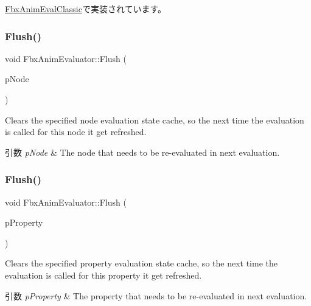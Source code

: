 \hyperlink{class_fbx_anim_eval_classic_a3618b50c5fd35f18f5e6f873ca07cf2e}{Fbx\+Anim\+Eval\+Classic}で実装されています。

\mbox{\label{class_fbx_anim_evaluator_a17b08c51a766be597aac881807913ea8}} 
\subsubsection{\texorpdfstring{Flush()}{Flush()}\hspace{0.1cm}{\footnotesize\ttfamily [1/2]}}
{\footnotesize\ttfamily void Fbx\+Anim\+Evaluator\+::\+Flush (\begin{DoxyParamCaption}\item[{\hyperlink{class_fbx_node}{Fbx\+Node} $\ast$}]{p\+Node }\end{DoxyParamCaption})}

Clears the specified node evaluation state cache, so the next time the evaluation is called for this node it get refreshed. 
\begin{DoxyParams}{引数}
{\em p\+Node} & The node that needs to be re-\/evaluated in next evaluation. \\
\hline
\end{DoxyParams}
\mbox{\label{class_fbx_anim_evaluator_a2f738a737153248cc988aca609c4bf84}} 
\subsubsection{\texorpdfstring{Flush()}{Flush()}\hspace{0.1cm}{\footnotesize\ttfamily [2/2]}}
{\footnotesize\ttfamily void Fbx\+Anim\+Evaluator\+::\+Flush (\begin{DoxyParamCaption}\item[{\hyperlink{class_fbx_property}{Fbx\+Property} \&}]{p\+Property }\end{DoxyParamCaption})}

Clears the specified property evaluation state cache, so the next time the evaluation is called for this property it get refreshed. 
\begin{DoxyParams}{引数}
{\em p\+Property} & The property that needs to be re-\/evaluated in next evaluation. \\
\hline
\end{DoxyParams}
\mbox{\label{class_fbx_anim_evaluator_a0e222bee0038d2324e38a996cc40527e}} 
